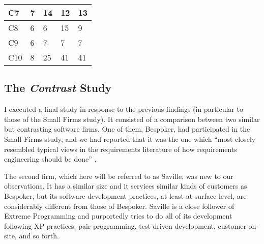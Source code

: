 \begin{table}[tbp]
{\begin{tabular}{p{1.4cm}p{2.4cm}p{2.4cm}p{2.4cm}p{2.4cm}}
\hline
\vspace{0.5pt} C7 & \vspace{0.5pt} 7 & \vspace{0.5pt} 14 & \vspace{0.5pt} 12 & \vspace{0.5pt} 13 \\
\hline
\vspace{0.5pt} C8 & \vspace{0.5pt} 6 & \vspace{0.5pt} 6 & \vspace{0.5pt} 15 & \vspace{0.5pt} 9 \\
\hline
\vspace{0.5pt} C9 & \vspace{0.5pt} 6 & \vspace{0.5pt} 7 & \vspace{0.5pt} 7 & \vspace{0.5pt} 7 \\
\hline
\vspace{0.5pt} C10 & \vspace{0.5pt} 8 & \vspace{0.5pt} 25 & \vspace{0.5pt} 41 & \vspace{0.5pt} 41 \\
\hline
\end{tabular}}
\end{table}



\subsection{The \emph{Contrast} Study}
\label{sec:Contrast}

I executed a final study in response to the previous findings (in particular to those of the Small Firms study). It consisted of a comparison between two similar but contrasting software firms. One of them, Bespoker, had participated in the Small Firms study, and we had reported that it was the one which ``most closely resembled typical views in the requirements literature of how requirements engineering should be done'' \cite{Aranda2007}.

The second firm, which here will be referred to as Saville, was new to our observations. It has a similar size and it services similar kinds of customers as Bespoker, but its software development practices, at least at surface level, are considerably different from those of Bespoker. Saville is a close follower of Extreme Programming \cite{Beck1999} and purportedly tries to do all of its development following XP practices: pair programming, test-driven development, customer on-site, and so forth.

